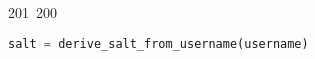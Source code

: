 201~200~\documentclass{article}
\begin{document}
\begin{lstlisting}[language=Python, caption=Hashing and Verifying Passwords with Argon2]
	                                                                                                                                                                                                                                                                                                	                                                                                                                                        	    	                                                                                                	                                                                                                                                                                                                                                                                                                                                	                                                                        	                                                                        	                                                                                                                                    salt = derive_salt_from_username(username)
	                                                                                                                                                                                                                                                                                                	                                                                                                                                        	    	                                                                                                	                                                                                                                                                                                                                                                                                                                                	                                                                        	                                                                        	                                                                                                                                        user_key = hash_secret_raw(

\end{lstlisting}
\end{document}
